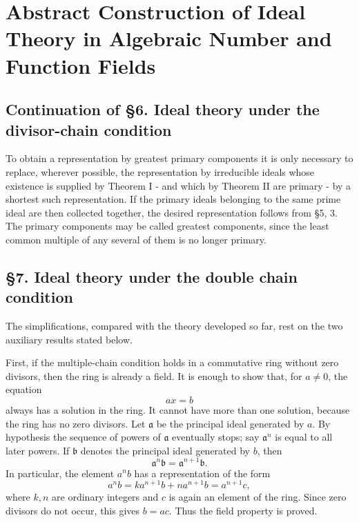 \documentclass[11pt]{article}
\begin{document}
\section{Abstract Construction of Ideal Theory in Algebraic Number and
Function
Fields}\label{abstract-construction-of-ideal-theory-in-algebraic-number-and-function-fields}

\subsection{Continuation of §6. Ideal theory under the divisor-chain
condition}\label{continuation-of-6.-ideal-theory-under-the-divisor-chain-condition}

To obtain a representation by greatest primary components it is only
necessary to replace, wherever possible, the representation by
irreducible ideals whose existence is supplied by Theorem I - and which
by Theorem II are primary - by a shortest such representation. If the
primary ideals belonging to the same prime ideal are then collected
together, the desired representation follows from §5, 3. The primary
components may be called greatest components, since the least common
multiple of any several of them is no longer primary.

\subsection{§7. Ideal theory under the double chain
condition}\label{ideal-theory-under-the-double-chain-condition}

The simplifications, compared with the theory developed so far, rest on
the two auxiliary results stated below.

First, if the multiple-chain condition holds in a commutative ring
without zero divisors, then the ring is already a field. It is enough to
show that, for \(a\ne0\), the equation \[
  ax=b
\] always has a solution in the ring. It cannot have more than one
solution, because the ring has no zero divisors. Let \(\mathfrak a\) be
the principal ideal generated by \(a\). By hypothesis the sequence of
powers of \(\mathfrak a\) eventually stops; say \(\mathfrak a^n\) is
equal to all later powers. If \(\mathfrak b\) denotes the principal
ideal generated by \(b\), then \[
  \mathfrak a^n\mathfrak b=\mathfrak a^{n+1}\mathfrak b.
\] In particular, the element \(a^n b\) has a representation of the form
\[
  a^n b = k a^{n+1}b+n a^{n+1}b = a^{n+1}c,
\] where \(k,n\) are ordinary integers and \(c\) is again an element of
the ring. Since zero divisors do not occur, this gives \(b=ac\). Thus
the field property is proved.
\end{document}
